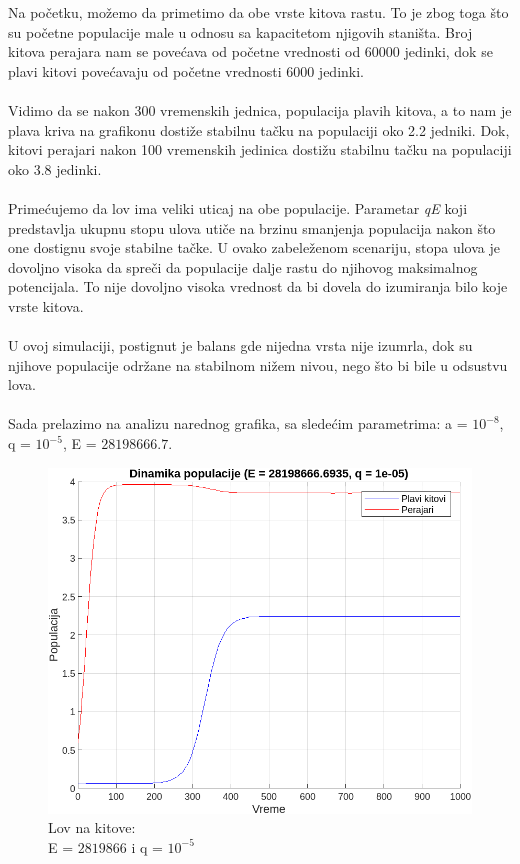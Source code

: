 \documentclass[a4paper]{article}
\begin{document}
{	
	Na početku, možemo da primetimo da obe vrste kitova rastu. To je zbog toga što su početne populacije male u odnosu sa kapacitetom njigovih staništa. Broj kitova perajara nam se povećava od početne vrednosti od 60000 jedinki, dok se plavi kitovi povećavaju od početne vrednosti 6000 jedinki. \\
	\\
	Vidimo da se nakon 300 vremenskih jednica, populacija plavih kitova, a to nam je plava kriva na grafikonu dostiže stabilnu tačku na populaciji oko 2.2 jedniki. Dok, kitovi perajari nakon 100 vremenskih jedinica dostižu stabilnu tačku na populaciji oko 3.8 jedinki. \\ 
	\\
	Primećujemo da lov ima veliki uticaj na obe populacije. Parametar \textit{qE} koji predstavlja ukupnu stopu ulova utiče na brzinu smanjenja populacija nakon što one dostignu svoje stabilne tačke. U ovako zabeleženom scenariju, stopa ulova je dovoljno visoka da spreči da populacije dalje rastu do njihovog maksimalnog potencijala. To nije dovoljno visoka vrednost da bi dovela do izumiranja bilo koje vrste kitova. \\ 
	\\ 
	U ovoj simulaciji, postignut je balans gde nijedna vrsta nije izumrla, dok su njihove populacije održane na stabilnom nižem nivou, nego što bi bile u odsustvu lova. \\
	\\
	\newpage
	Sada prelazimo na analizu narednog grafika, sa sledećim parametrima: a = $10^{-8}$, q = $10^{-5}$, E = $28198666.7$.
	
	\begin{figure}[h]
		\centering
		\begin{minipage}[h]{0.45\linewidth}
			\centering
			\includegraphics[width=\textwidth]{lov2.png}
			\caption{Lov na kitove: \\E = $2819866$ i q = $10^{-5}$}
			\label{slika1: lov-2}
		\end{minipage}
	\end{figure}
	
}
\end{document}
